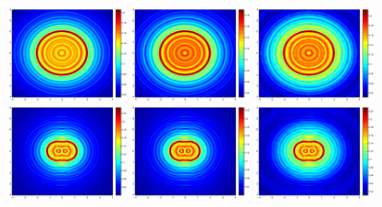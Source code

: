 \begin{figure}
	\centering
	\includegraphics[width=0.28\textwidth]{./Img/graphic_phase/circle_r_10_k_4_vector.eps}
	\includegraphics[width=0.28\textwidth]{./Img/graphic_phase/circle_r_10_k_4_scalar.eps}
	\includegraphics[width=0.28\textwidth]{./Img/graphic_phase/circle_r_10_k_4_phaseless_n_512_bias_100.eps}
	\includegraphics[width=0.28\textwidth]{./Img/graphic_phase/peanut_r_10_k_4_vector.eps}
	\includegraphics[width=0.28\textwidth]{./Img/graphic_phase/peanut_r_10_k_4_scalar.eps}
	\includegraphics[width=0.28\textwidth]{./Img/graphic_phase/peanut_r_10_k_4_phaseless_n_512_bias_100.eps}

\end{figure}
